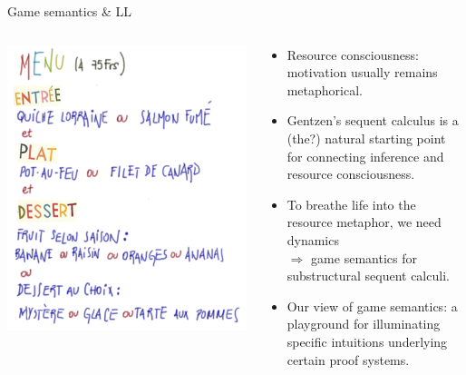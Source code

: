 \documentclass[9pt]{beamer}
\renewcommand{\emph}[1]{{\color{blue} #1}}
\newcommand{\emphdb}[1]{{\color{darkblue} #1}}
\newcommand{\empha}[1]{{\color{darkgreen} #1}}
\newcommand{\emphb}[1]{{\color{darkvio} #1}}
\newcommand{\emphdo}[1]{{\color{darkorange} #1}}
\begin{document}
\begin{frame}{Game semantics \& LL}
\begin{columns}[T]
    \begin{column}{.4\textwidth}
    \includegraphics[scale=0.15]{../figs/menu1}
    \end{column}
    \begin{column}{.5\textwidth}
 \begin{itemize}
\item  \emph{Resource consciousness:} motivation usually remains \emphb{metaphorical}.

\item \emphdb{Gentzen's sequent calculus}  is a (the?) natural starting point
        for connecting  \emphdb{inference and resource consciousness}.

\item To \emphb{breathe life into the resource metaphor}, we need \emph{dynamics}\\[1ex]
       $\Longrightarrow$ \emphb{game semantics} for substructural sequent calculi. 
\item \empha{Our view of game semantics:} a \emphdo{playground} for illuminating specific 
intuitions underlying certain
proof systems.
\end{itemize}
    \end{column}
  \end{columns}
\end{frame}
\end{document}
